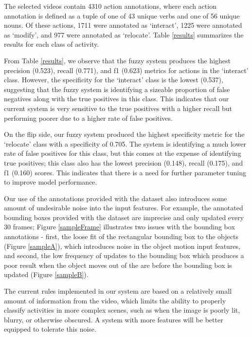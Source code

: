 \documentclass[12pt]{report}
\begin{document}
The selected videos contain 4310 action annotations, where each action annotation is defined as a tuple of one of 43 unique verbs and one of 56 unique nouns. Of these actions, 1711 were annotated as `interact', 1225 were annotated as `modify', and 977 were annotated as `relocate'. Table \ref{results} summarizes the results for each class of activity.

From Table \ref{results}, we observe that the fuzzy system produces the highest precision (0.523), recall (0.771), and f1 (0.623) metrics for actions in the `interact' class. However, the specificity for the `interact' class is the lowest (0.537), suggesting that the fuzzy system is identifying a sizeable proportion of false negatives along with the true positives in this class. This indicates that our current system is very sensitive to the true positives with a higher recall but performing poorer due to a higher rate of false positives.

On the flip side, our fuzzy system produced the highest specificity metric for the `relocate' class with a specificity of 0.705. The system is identifying a much lower rate of false positives for this class, but this comes at the expense of identifying true positives; this class also has the lowest precision (0.148), recall (0.175), and f1 (0.160) scores. This indicates that there is a need for further parameter tuning to improve model performance.

Our use of the annotations provided with the dataset also introduces some amount of undesirable noise into the input features. For example, the annotated bounding boxes provided with the dataset are imprecise and only updated every 30 frames; Figure \ref{sampleFrame} illustrates two issues with the bounding box annotations - first, the loose fit of the rectangular bounding box to the objects (Figure \ref{sampleA}), which introduces noise in the object motion input features, and second, the low frequency of updates to the bounding box which produces a poor result when the object moves out of the are before the bounding box is updated (Figure \ref{sampleB}).

The current rules implemented in our system are based on a relatively small amount of information from the video, which limits the ability to properly classify activities in more complex scenes, such as when the image is poorly lit, blurry, or otherwise obscured. A system with more features will be better equipped to tolerate this noise.
\end{document}
